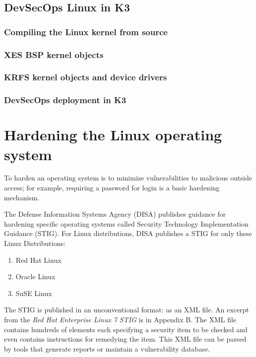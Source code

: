 \documentclass[12pt]{article}
\begin{document}
%
\subsection{DevSecOps Linux in K3}

\subsubsection{Compiling the Linux kernel from source}

\subsubsection{XES BSP kernel objects}

\subsubsection{KRFS kernel objects and device drivers}

\subsubsection{DevSecOps deployment in K3}



%
\newpage
\section{Hardening the Linux operating system}
\label{sec:image_hardening}

To harden an operating system is to minimize vulnerabilities to malicious
outside access; for example, requiring a password for login is a basic hardening
mechanism.

The Defense Information Systems Agency (DISA) publishes guidance for hardening
specific operating systems called Security Technology Implementation Guidance
(STIG).  For Linux distributions, DISA publishes a STIG for only these Linux
Distributions:
\begin{enumerate}
    \item Red Hat Linux
    \item Oracle Linux
    \item SuSE Linux
\end{enumerate}

The STIG is published in an unconventional format: as an XML file.  An excerpt
from the \emph{Red Hat Enterprise Linux 7 STIG} is in Appendix B.  The XML file
contains hundreds of elements each specifying a security item to be checked
and even contains instructions for remedying the item.  This XML file can be
parsed by tools that generate reports or maintain a vulnerability database.
\end{document}
